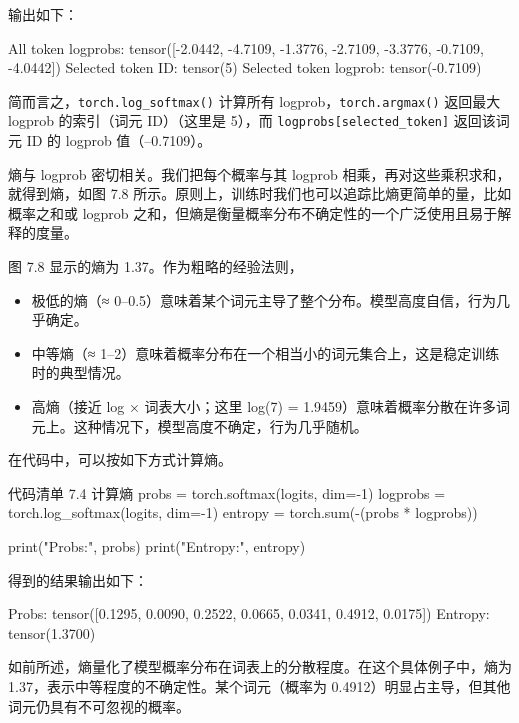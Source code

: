 输出如下：

\begin{codebox}
All token logprobs: tensor([-2.0442, -4.7109, -1.3776,
-2.7109, -3.3776, -0.7109, -4.0442])
Selected token ID: tensor(5)
Selected token logprob: tensor(-0.7109)
\end{codebox}

简而言之，\texttt{torch.log\_softmax()} 计算所有 logprob，\texttt{torch.argmax()} 返回最大 logprob 的索引（词元 ID）（这里是 5），而 \texttt{logprobs[selected\_token]} 返回该词元 ID 的 logprob 值（–0.7109）。

熵与 logprob 密切相关。我们把每个概率与其 logprob 相乘，再对这些乘积求和，就得到熵，如图 7.8 所示。原则上，训练时我们也可以追踪比熵更简单的量，比如概率之和或 logprob 之和，但熵是衡量概率分布不确定性的一个广泛使用且易于解释的度量。


图 7.8 显示的熵为 1.37。作为粗略的经验法则，

\begin{itemize}
\item 极低的熵（≈ 0–0.5）意味着某个词元主导了整个分布。模型高度自信，行为几乎确定。
\item 中等熵（≈ 1–2）意味着概率分布在一个相当小的词元集合上，这是稳定训练时的典型情况。
\item 高熵（接近 log × 词表大小；这里 log(7) = 1.9459）意味着概率分散在许多词元上。这种情况下，模型高度不确定，行为几乎随机。
\end{itemize}

在代码中，可以按如下方式计算熵。

\begin{codeboxt}{代码清单 7.4 计算熵}
probs = torch.softmax(logits, dim=-1)
logprobs = torch.log_softmax(logits, dim=-1)
entropy = torch.sum(-(probs * logprobs))

print("Probs:", probs)
print("Entropy:", entropy)
\end{codeboxt}

得到的结果输出如下：

\begin{codebox}
Probs: tensor([0.1295, 0.0090, 0.2522, 0.0665, 0.0341, 0.4912, 0.0175])
Entropy: tensor(1.3700)
\end{codebox}

如前所述，熵量化了模型概率分布在词表上的分散程度。在这个具体例子中，熵为 1.37，表示中等程度的不确定性。某个词元（概率为 0.4912）明显占主导，但其他词元仍具有不可忽视的概率。

